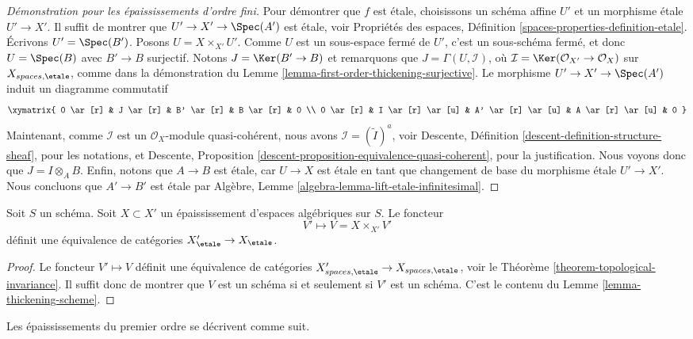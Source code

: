 \begin{proof}[Démonstration pour les épaississements d'ordre fini]
\medskip\noindent
Pour démontrer que $f$ est étale, choisissons un schéma affine $U'$ et un
morphisme étale $U' \to X'$. Il suffit de montrer que
$U' \to X' \to \Spec(A')$ est étale, voir
Propriétés des espaces, Définition \ref{spaces-properties-definition-etale}.
Écrivons $U' = \Spec(B')$. Posons $U = X \times_{X'} U'$. Comme $U$
est un sous-espace fermé de $U'$, c'est un sous-schéma fermé, et donc
$U = \Spec(B)$ avec $B' \to B$ surjectif. Notons
$J = \Ker(B' \to B)$ et remarquons que $J = \Gamma(U, \mathcal{I})$,
où $\mathcal{I} = \Ker(\mathcal{O}_{X'} \to \mathcal{O}_X)$
sur $X_{spaces, \etale}$, comme dans la démonstration du
Lemme \ref{lemma-first-order-thickening-surjective}.
Le morphisme $U' \to X' \to \Spec(A')$ induit un diagramme
commutatif
$$
\xymatrix{
0 \ar[r] &
J \ar[r] &
B' \ar[r] &
B \ar[r] & 0 \\
0 \ar[r] &
I \ar[r] \ar[u] &
A' \ar[r] \ar[u] &
A \ar[r] \ar[u] & 0
}
$$
Maintenant, comme $\mathcal{I}$ est un $\mathcal{O}_X$-module quasi-cohérent,
nous avons $\mathcal{I} = (\widetilde I)^a$, voir
Descente, Définition \ref{descent-definition-structure-sheaf},
pour les notations, et
Descente, Proposition \ref{descent-proposition-equivalence-quasi-coherent},
pour la justification. Nous voyons donc que $J = I \otimes_A B$.
Enfin, notons que $A \to B$ est étale, car $U \to X$ est étale en tant que
changement de base du morphisme étale $U' \to X'$.
Nous concluons que $A' \to B'$ est étale par
Algèbre, Lemme \ref{algebra-lemma-lift-etale-infinitesimal}.
\end{proof}

\begin{lemma}
\label{lemma-thickening-equivalence}
Soit $S$ un schéma. Soit $X \subset X'$ un épaississement d'espaces algébriques
sur $S$. Le foncteur
$$
V' \longmapsto V = X \times_{X'} V'
$$
définit une équivalence de catégories
$X'_\etale \to X_\etale$.
\end{lemma}

\begin{proof}
Le foncteur $V' \mapsto V$ définit une équivalence de catégories
$X'_{spaces, \etale} \to X_{spaces, \etale}$, voir le
Théorème \ref{theorem-topological-invariance}.
Il suffit donc de montrer que $V$ est un schéma si et seulement si $V'$ est
un schéma. C'est le contenu du
Lemme \ref{lemma-thickening-scheme}.
\end{proof}

\noindent
Les épaississements du premier ordre se décrivent comme suit.

